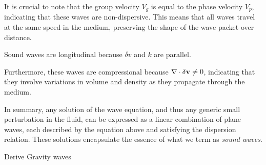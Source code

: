 It is crucial to note that the group velocity \( V_g \) is equal to the phase velocity \( V_p \), indicating that these waves are non-dispersive. This means that all waves travel at the same speed in the medium, preserving the shape of the wave packet over distance.

{\color{red}Sound waves are longitudinal because \( \delta v \) and \( k  \) are parallel.}

Furthermore, these waves are compressional because \( \nabla \cdot \delta \vb v \ne 0 \), indicating that they involve variations in volume and density as they propagate through the medium.

%
%

In summary, any solution of the wave equation, and thus any generic small perturbation in the fluid, can be expressed as a linear combination of plane waves, each described by the equation above and satisfying the dispersion relation. These solutions encapsulate the essence of what we term as \emph{sound waves}.



%
%
 
\begin{problem}
Derive Gravity waves
\end{problem}

